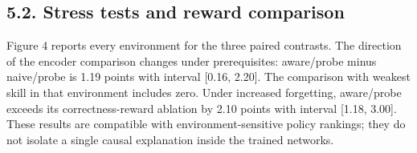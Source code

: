 \documentclass[preprint,11pt,authoryear]{elsarticle}
\begin{document}
\subsection*{5.2. Stress tests and reward comparison}

Figure 4 reports every environment for the three paired contrasts. The direction of the encoder comparison changes under prerequisites: aware/probe minus naive/probe is 1.19 points with interval [0.16, 2.20]. The comparison with weakest skill in that environment includes zero. Under increased forgetting, aware/probe exceeds its correctness-reward ablation by 2.10 points with interval [1.18, 3.00]. These results are compatible with environment-sensitive policy rankings; they do not isolate a single causal explanation inside the trained networks.

\begin{figure}[htbp]\centering


\end{figure}
\end{document}
